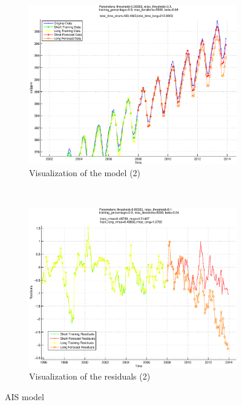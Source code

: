 \documentclass{assignment}
\begin{document}
\begin{figure}
  \begin{subfigure}[b]{0.51\textwidth}
     \includegraphics[width=\textwidth]{images/ais_visualization_2.eps}
  \caption{Visualization of the model (2)}
  \end{subfigure}%
   ~ %
  \begin{subfigure}[b]{0.51\textwidth}
    \includegraphics[width=\textwidth]{images/ais_residuals_2.eps}
  \caption{Visualization of the residuals (2)}
  \end{subfigure}

  \caption{AIS model}
\label{fig:ais_model}
\end{figure}
\end{document}
